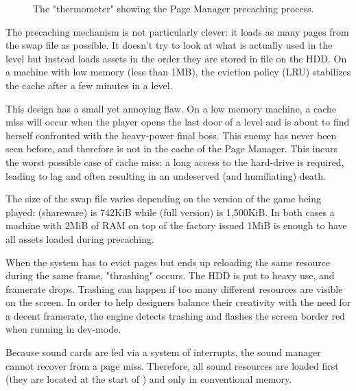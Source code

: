 \documentclass[book.tex]{subfiles}
\begin{document}
 \par
\begin{figure}[H]
\centering
 \caption{The "thermometer" showing the Page Manager precaching process.}
 \end{figure}
 \par
The precaching mechanism is not particularly clever: it loads as many pages from the swap file as possible. It doesn't try to look at what is actually used in the level but instead loads assets in the order they are stored in  file on the HDD. On a machine with low memory (less than 1MB), the eviction policy (LRU) stabilizes the cache after a few minutes in a level.\\
\par
This design has a small yet annoying flaw. On a low memory machine, a cache miss will occur when the player opens the last door of a level and is about to find herself confronted with the heavy-power final boss. This enemy has never been seen before, and therefore is not in the cache of the Page Manager. This incurs the worst possible case of cache miss: a long access to the hard-drive is required, leading to lag and often resulting in an undeserved (and humiliating) death.\\
\par
The size of the swap file varies depending on the version of the game being played:  (shareware) is 742KiB while  (full version) is 1,500KiB. In both cases a machine with 2MiB of RAM on top of the factory issued 1MiB is enough to have all assets loaded during precaching.\\
\par
{} When the system has to evict pages but ends up reloading the same resource during the same frame, "thrashing" occurs. The HDD is put to heavy use, and framerate drops. Trashing can happen if too many different resources are visible on the screen. In order to help designers balance their creativity with the need for a decent framerate, the engine detects trashing and flashes the screen border red when running in dev-mode.\\
\par
{} Because sound cards are fed via a system of interrupts, the sound manager cannot recover from a page miss. Therefore, all sound resources are loaded first (they are located at the start of ) and only in conventional memory.
\end{document}
